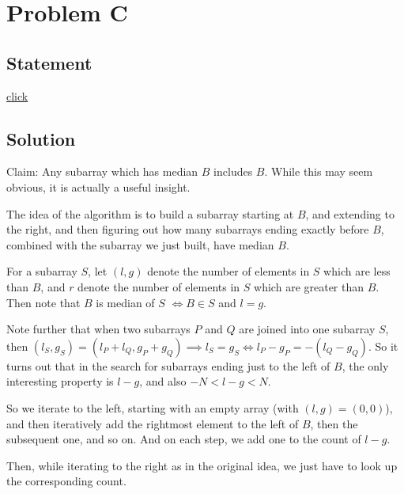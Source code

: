 \section{Problem C}
\subsection{Statement}
\href{http://foobar.iiitd.edu.in/contest/team/problem.php?id=529}{click}

\subsection{Solution}
Claim: Any subarray which has median $B$ includes $B$.
While this may seem obvious, it is actually a useful insight.

The idea of the algorithm is to build a subarray starting at $B$, and extending
to the right, and then figuring out how many subarrays ending exactly before $B$,
combined with the subarray we just built, have median $B$.

For a subarray $S$, let $(l, g)$ denote the number of elements in $S$ which are
less than $B$, and $r$ denote the number of elements in $S$ which are greater
than $B$. Then note that $B$ is median of $S$ $\iff B \in S$ and $l = g$.

Note further that when two subarrays $P$ and $Q$ are joined into one subarray
$S$, then $(l_S, g_S) = (l_P + l_Q, g_P + g_Q) \implies l_S = g_S
\iff l_P - g_P = -(l_Q - g_Q)$.
So it turns out that in the search for subarrays ending just to the left of $B$,
the only interesting property is $l - g$, and also $-N < l - g < N$.

So we iterate to the left, starting with an empty array (with $(l, g) = (0, 0)$),
and then iteratively add the rightmost element to the left of $B$, then the subsequent
one, and so on. And on each step, we add one to the count of $l - g$.

Then, while iterating to the right as in the original idea, we just have to look up the
corresponding count.